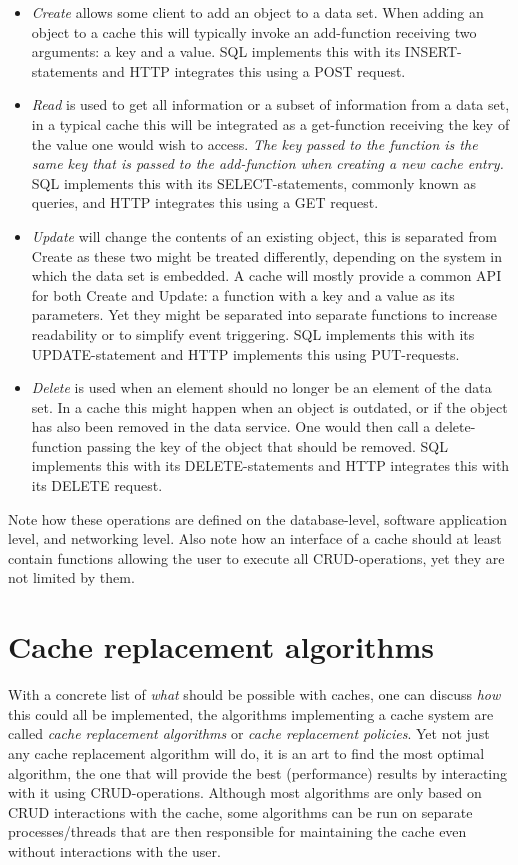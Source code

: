 \documentclass[pdftex,a4paper,12pt,twoside]{report}
\begin{document}
\begin{itemize}
\item \emph{Create} allows some client to add an object to a data set. When adding an object to a cache this will typically invoke an add-function receiving two arguments: a key and a value. SQL implements this with its INSERT-statements and HTTP integrates this using a POST request.
\item \emph{Read} is used to get all information or a subset of information from a data set, in a typical cache this will be integrated as a get-function receiving
the key of the value one would wish to access. \emph{The key passed to the function is the same key that is passed to the add-function when creating a new cache entry.} SQL implements this with its SELECT-statements, commonly known as queries, and HTTP integrates this using a GET request.
\item \emph{Update} will change the contents of an existing object, this is separated from Create as these two might be treated differently, depending on the system in which the data set is embedded. A cache will mostly provide a common API for both Create and Update: a function with a key and a value as its parameters. Yet they might be separated into separate functions to increase readability or to simplify event triggering. SQL implements this with its UPDATE-statement and HTTP implements this using PUT-requests.
\item \emph{Delete} is used when an element should no longer be an element of the data set. In a cache this might happen when an object is outdated, or if the object has also been removed in the data service. One would then call a delete-function passing the key of the object that should be removed. SQL implements this with its DELETE-statements and HTTP integrates this with its DELETE request.
\end{itemize}
\citep{battle2008bridging} Note how these operations are defined on the database-level, software application level, and networking level. Also note how an interface of a cache should at least contain functions allowing the user to execute all CRUD-operations, yet they are not limited by them.
\chapter{Cache replacement algorithms}
\label{chap:caching_algorithms}
With a concrete list of \emph{what} should be possible with caches, one can discuss \emph{how} this could all be implemented, the algorithms implementing a cache system are called \emph{cache replacement algorithms} or \emph{cache replacement policies}. Yet not just any cache replacement algorithm will do, it is an art to find the most optimal algorithm, the one that will provide the best (performance) results by interacting with it using CRUD-operations.
Although most algorithms are only based on CRUD interactions with the cache, some algorithms can be run on separate processes/threads that are
then responsible for maintaining the cache even without interactions with the user.
\end{document}
